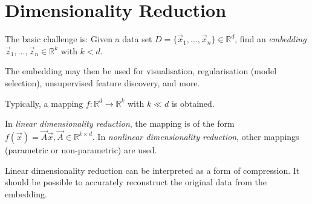\section{Dimensionality Reduction}
The basic challenge is:
Given a data set
$D = \{\vec{x}_1, \dotsc, \vec{x}_n\} \in \mathbb{R}^d$,
find an \emph{embedding}
$\vec{z}_1, \dotsc, \vec{z}_n \in \mathbb{R}^k$
with $k < d$.

The embedding may then be used for visualisation,
regularisation (model selection),
unsupervised feature discovery,
and more.

Typically, a mapping $f : \mathbb{R}^d \to \mathbb{R}^k$
with $k \ll d$ is obtained.

In \emph{linear dimensionality reduction},
the mapping is of the form
$f(\vec{x}) = \vec{A}\vec{x}, \vec{A} \in \mathbb{R}^{k \times d}$.
In \emph{nonlinear dimensionality reduction},
other mappings (parametric or non-parametric) are used.

Linear dimensionality reduction can be interpreted as a form of
compression.
It should be possible to accurately reconstruct the original data
from the embedding.

